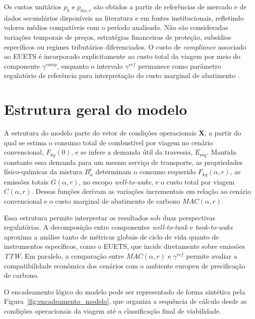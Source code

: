 Os custos unitários $p_b$ e $p_{bio,r}$ são obtidos a partir de referências de mercado e de dados secundários disponíveis na literatura e em fontes institucionais, refletindo valores médios compatíveis com o período analisado. Não são consideradas variações temporais de preços, estratégias financeiras de proteção, subsídios específicos ou regimes tributários diferenciados. O custo de \emph{compliance} associado ao \gls{EUETS} é incorporado explicitamente ao custo total da viagem por meio do componente $\gamma^{comp}$, enquanto o intervalo $\gamma^{ref}$ permanece como parâmetro regulatório de referência para interpretação do custo marginal de abatimento \citep{eu_reg_2023_1805}.

\section{Estrutura geral do modelo}

A estrutura do modelo parte do vetor de condições operacionais $\mathbf{X}$, a partir do qual se estima o consumo total de combustível por viagem no cenário convencional, $F_{kg}(0)$, e se infere a demanda útil da travessia, $E_{\text{req}}$. Mantida constante essa demanda para um mesmo serviço de transporte, as propriedades físico-químicas da mistura $B_{\alpha}^{r}$ determinam o consumo requerido $F_{kg}(\alpha,r)$, as emissões totais $G(\alpha,r)$, no escopo \emph{well-to-wake}, e o custo total por viagem $C(\alpha,r)$. Dessas funções derivam as variações incrementais em relação ao cenário convencional e o custo marginal de abatimento de carbono $MAC(\alpha,r)$.

Essa estrutura permite interpretar os resultados sob duas perspectivas regulatórias. A decomposição entre componentes \emph{well-to-tank} e \emph{tank-to-wake} aproxima a análise tanto de métricas globais de ciclo de vida quanto de instrumentos específicos, como o \gls{EUETS}, que incide diretamente sobre emissões \emph{TTW}. Em paralelo, a comparação entre $MAC(\alpha,r)$ e $\gamma^{ref}$ permite avaliar a compatibilidade econômica dos cenários com o ambiente europeu de precificação de carbono.

O encadeamento lógico do modelo pode ser representado de forma sintética pela Figura~\ref{fig:encadeamento_modelo}, que organiza a sequência de cálculo desde as condições operacionais da viagem até a classificação final de viabilidade.

